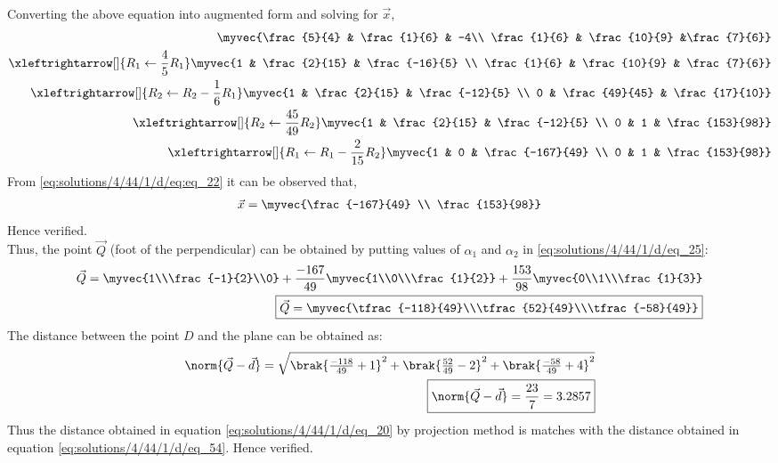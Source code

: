 Converting the above equation into augmented form and solving for $\vec{x}$,
\begin{align}
    \myvec{\frac{5}{4} & \frac{1}{6} & -4\\ \frac{1}{6} & \frac{10}{9} &\frac{7}{6}}\nonumber\\ 
    \xleftrightarrow[]{R_1 \leftarrow \frac{4}{5}R_1} 
    \myvec{1 & \frac{2}{15} & \frac{-16}{5} \\ \frac{1}{6} & \frac{10}{9} & \frac{7}{6}} \nonumber \\ 
    \xleftrightarrow[]{R_2 \leftarrow R_2-\frac{1}{6}R_1} \myvec{1 & \frac{2}{15} & \frac{-12}{5} \\ 0 & \frac{49}{45} & \frac{17}{10}}\nonumber\\
    \xleftrightarrow[]{R_2 \leftarrow \frac{45}{49}R_2} \myvec{1 & \frac{2}{15} & \frac{-12}{5} \\ 0 & 1 & \frac{153}{98}}\nonumber\\
    \xleftrightarrow[]{R_1 \leftarrow R_1-\frac{2}{15}R_2} \myvec{1 & 0 & \frac{-167}{49} \\ 0 & 1 & \frac{153}{98}}\label{eq:solutions/4/44/1/d/eq:eq_22}
\end{align}
From \eqref{eq:solutions/4/44/1/d/eq:eq_22} it can be observed that,
\begin{align} 
    \vec{x} = \myvec{\frac{-167}{49} \\ \frac{153}{98}} 
\end{align}
Hence verified.\\
Thus, the point $\vec{Q}$ (foot of the perpendicular) can be obtained by putting values of $\alpha_1$ and $\alpha_2$ in \eqref{eq:solutions/4/44/1/d/eq_25}:
\begin{align}
    \vec{Q} = \myvec{1\\\frac{-1}{2}\\0} + \frac{-167}{49}\myvec{1\\0\\\frac{1}{2}} +  \frac{153}{98}\myvec{0\\1\\\frac{1}{3}}\\
    \boxed{\vec{Q} = \myvec{\tfrac{-118}{49}\\\tfrac{52}{49}\\\tfrac{-58}{49}}}
\end{align}
The distance between the point $D$ and the plane can be obtained as:
\begin{align}
    \norm{\vec{Q}-\vec{d}}=\sqrt{\brak{\tfrac{-118}{49}+1}^2+\brak{\tfrac{52}{49}-2}^2+\brak{\tfrac{-58}{49}+4}^2}\\
    \boxed{\norm{\vec{Q}-\vec{d}}=\frac{23}{7}=3.2857} \label{eq:solutions/4/44/1/d/eq_54}
\end{align}
Thus the distance obtained in equation \eqref{eq:solutions/4/44/1/d/eq_20} by projection method is matches with the distance obtained in equation \eqref{eq:solutions/4/44/1/d/eq_54}. Hence verified.

